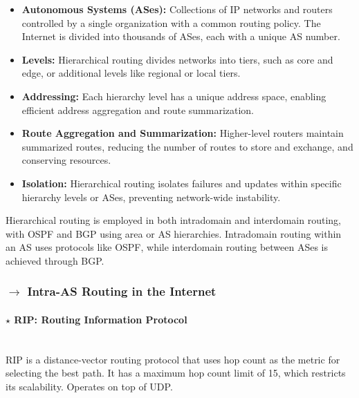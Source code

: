 \begin{itemize}
    \item \textbf{Autonomous Systems (ASes):} Collections of IP networks and routers controlled by a single organization with a common routing policy. The Internet is divided into thousands of ASes, each with a unique AS number.
    
    \item \textbf{Levels:} Hierarchical routing divides networks into tiers, such as core and edge, or additional levels like regional or local tiers.
    
    \item \textbf{Addressing:} Each hierarchy level has a unique address space, enabling efficient address aggregation and route summarization.
    
    \item \textbf{Route Aggregation and Summarization:} Higher-level routers maintain summarized routes, reducing the number of routes to store and exchange, and conserving resources.
    
    \item \textbf{Isolation:} Hierarchical routing isolates failures and updates within specific hierarchy levels or ASes, preventing network-wide instability.
\end{itemize}

\noindent Hierarchical routing is employed in both intradomain and interdomain routing, with OSPF and BGP using area or AS hierarchies. Intradomain routing within an AS uses protocols like OSPF, while interdomain routing between ASes is achieved through BGP.

\subsubsection[4.3.2 Intra-AS Routing in the Internet]{$\rightarrow$ Intra-AS Routing in the Internet}
\label{subsubsec:AS-protocols}

\paragraph[4.3.2.1 RIP: Routing Information Protocol]{$\pmb{\star}$ RIP: Routing Information Protocol}\mbox{}\\[4pt]
RIP is a distance-vector routing protocol that uses hop count as the metric for selecting the best path. It has a maximum hop count limit of 15, which restricts its scalability. Operates on top of UDP.

